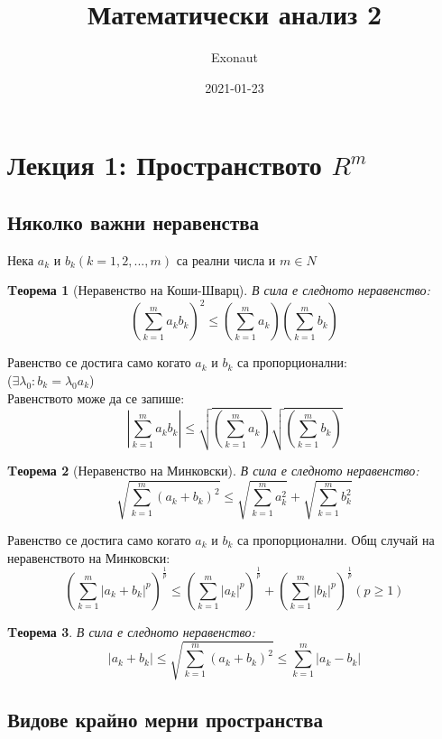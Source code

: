 \documentclass[fleqn]{article}
\title{Математически анализ 2}
\date{2021-01-23}
\author{Exonaut}
\newtheorem{theorem}{Tеорема}[section]
\begin{document}
\maketitle
{}
\newpage
{}

\tableofcontents
\newpage

\section{Лекция 1: Пространството $R^m$}
\subsection{Няколко важни неравенства}
Нека $a_k $ и $b_k (k = 1, 2, ..., m) $ са реални числа и $m \in N$
\begin{theorem}[Неравенство на Коши-Шварц]
В сила е следното неравенство: \\
$$\left( \sum_{k=1}^{m}a_kb_k \right ) ^ 2   \leq  \left( \sum_{k=1}^{m}a_k \right)  \left( \sum_{k=1}^{m}b_k  \right) $$
\end{theorem}
Равенство се достига само когато $a_k$ и $b_k$ са пропорционални:\\
 ($\exists \lambda_0: b_k =\lambda_0 a_k  $)\\
Равенството може да се запише: 
$$\displaystyle\left\lvert \sum_{k=1}^{m}a_kb_k \right \rvert \leq \sqrt{\left( \sum_{k=1}^{m}a_k \right)}  \sqrt{ \left( \sum_{k=1}^{m}b_k  \right)} $$

\begin{theorem}[Неравенство на Минковски]
В сила е следното неравенство: \\
$$\sqrt{ \sum_{k=1}^{m} (a_k + b_k)^2}   \leq \sqrt{ \sum_{k=1}^{m}a_k^2 } + \sqrt{ \sum_{k=1}^{m}b_k^2 }$$
\end{theorem}
Равенство се достига само когато $a_k$ и $b_k$ са пропорционални.
Общ случай на неравенството на Минковски:
$$\left ( \sum_{k=1}^{m} |a_k + b_k|^p \right)^\frac{1}{p}   \leq\left ( \sum_{k=1}^{m}|a_k|^p\right)^\frac{1}{p} + \left ( \sum_{k=1}^{m} |b_k|^p \right)^\frac{1}{p}   ( p\geq 1)$$

\begin{theorem}
В сила е следното неравенство: \\
$$ |a_k + b_k|  \leq \sqrt{ \sum_{k=1}^{m} (a_k + b_k)^2} \leq   \sum_{k=1}^{m}|a_k - b_k| $$
\end{theorem}

\subsection{Видове крайно мерни пространства}
\end{document}
